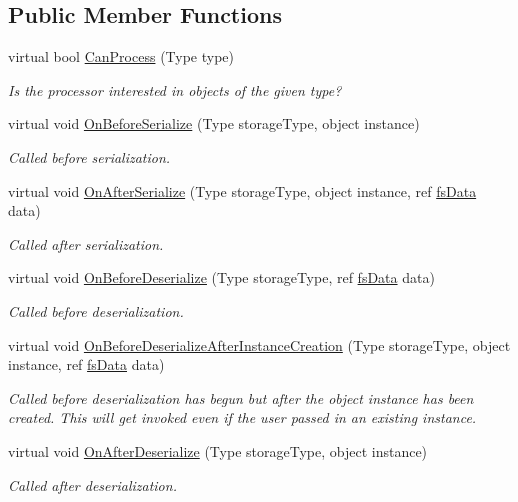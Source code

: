 \subsection*{Public Member Functions}
\begin{DoxyCompactItemize}
\item 
virtual bool \hyperlink{class_full_serializer_1_1fs_object_processor_a5dc981f868302d15a59def67ed4e8a5d}{Can\+Process} (Type type)
\begin{DoxyCompactList}\small\item\em Is the processor interested in objects of the given type? \end{DoxyCompactList}\item 
virtual void \hyperlink{class_full_serializer_1_1fs_object_processor_a48818569c78a826069594fb5ce6e32f2}{On\+Before\+Serialize} (Type storage\+Type, object instance)
\begin{DoxyCompactList}\small\item\em Called before serialization. \end{DoxyCompactList}\item 
virtual void \hyperlink{class_full_serializer_1_1fs_object_processor_a1260737d69e95e90ea697620ee24a9ad}{On\+After\+Serialize} (Type storage\+Type, object instance, ref \hyperlink{class_full_serializer_1_1fs_data}{fs\+Data} data)
\begin{DoxyCompactList}\small\item\em Called after serialization. \end{DoxyCompactList}\item 
virtual void \hyperlink{class_full_serializer_1_1fs_object_processor_af1d75938389278b6ceffdc17dd7e6424}{On\+Before\+Deserialize} (Type storage\+Type, ref \hyperlink{class_full_serializer_1_1fs_data}{fs\+Data} data)
\begin{DoxyCompactList}\small\item\em Called before deserialization. \end{DoxyCompactList}\item 
virtual void \hyperlink{class_full_serializer_1_1fs_object_processor_a99e0c1a7d896539470bbe7f43565a5a3}{On\+Before\+Deserialize\+After\+Instance\+Creation} (Type storage\+Type, object instance, ref \hyperlink{class_full_serializer_1_1fs_data}{fs\+Data} data)
\begin{DoxyCompactList}\small\item\em Called before deserialization has begun but {\itshape after} the object instance has been created. This will get invoked even if the user passed in an existing instance. \end{DoxyCompactList}\item 
virtual void \hyperlink{class_full_serializer_1_1fs_object_processor_a147c5f6828b9cf92703152ee7e1611dd}{On\+After\+Deserialize} (Type storage\+Type, object instance)
\begin{DoxyCompactList}\small\item\em Called after deserialization. \end{DoxyCompactList}\end{DoxyCompactItemize}


